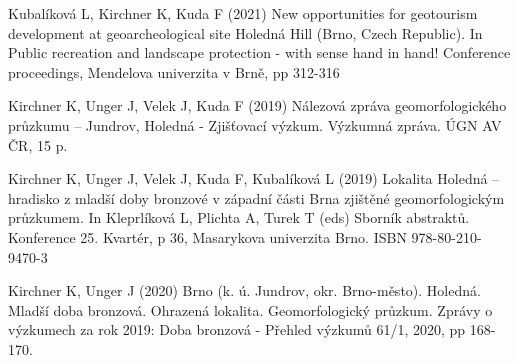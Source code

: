{Kubalíková L, Kirchner K, Kuda F (2021) New opportunities for geotourism development at geoarcheological site Holedná Hill (Brno, Czech Republic). In Public recreation and landscape protection - with sense hand in hand! Conference proceedings, Mendelova univerzita v Brně, pp 312-316

Kirchner K, Unger J, Velek J, Kuda F (2019) Nálezová zpráva geomorfologického průzkumu – Jundrov, Holedná - Zjišťovací výzkum. Výzkumná zpráva. ÚGN AV ČR, 15 p.

Kirchner K, Unger J, Velek J, Kuda F, Kubalíková L (2019) Lokalita Holedná – hradisko z mladší doby bronzové v západní části Brna zjištěné geomorfologickým průzkumem. In Kleprlíková L, Plichta A, Turek T (eds) Sborník abstraktů. Konference 25. Kvartér, p 36, Masarykova univerzita Brno. ISBN 978-80-210-9470-3

Kirchner K, Unger J (2020) Brno (k. ú. Jundrov, okr. Brno-město). Holedná. Mladší doba bronzová. Ohrazená lokalita. Geomorfologický průzkum. Zprávy o výzkumech za rok 2019: Doba bronzová - Přehled výzkumů 61/1, 2020, pp 168-170.
}

